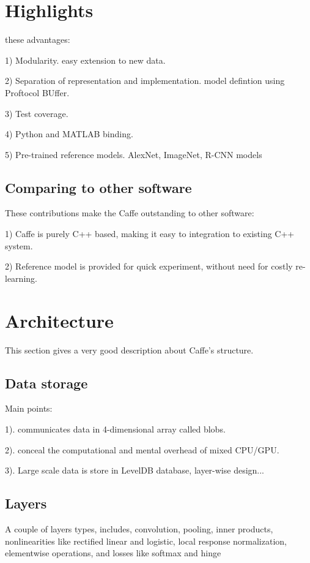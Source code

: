 \documentclass{article}
\begin{document}
\section{Highlights}

these advantages:

1) Modularity. easy extension to new data.

2) Separation of representation and implementation. model defintion using Proftocol BUffer.

3) Test coverage.

4) Python and MATLAB binding.

5) Pre-trained reference models. AlexNet, ImageNet, R-CNN models


\subsection{Comparing to other software}
These contributions make the Caffe outstanding to other software:

1) Caffe is purely C++ based, making it easy to integration to existing C++ system.

2) Reference model is provided for quick experiment, without need for costly re-learning.


\section{Architecture}

This section gives a very good description about Caffe's structure.

\subsection{Data storage}

Main points:

1). communicates data in 4-dimensional array called blobs.

2). conceal the computational and mental overhead of mixed CPU/GPU.

3). Large scale data is store in LevelDB database, layer-wise design...


\subsection{Layers}

A couple of layers types, includes, convolution,
pooling, inner products, nonlinearities like rectified
linear and logistic, local response normalization, elementwise
operations, and losses like softmax and hinge 
\end{document}
